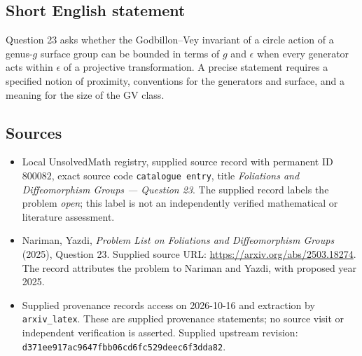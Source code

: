 \documentclass[11pt]{article}
\begin{document}
\subsection{Short English statement}
Question 23 asks whether the Godbillon--Vey invariant of a circle action of a genus-\(g\) surface group can be bounded in terms of \(g\) and \(\epsilon\) when every generator acts within \(\epsilon\) of a projective transformation. A precise statement requires a specified notion of proximity, conventions for the generators and surface, and a meaning for the size of the GV class.
\subsection{Sources}
\begin{itemize}
\item Local UnsolvedMath registry, supplied source record with permanent ID \(800082\), exact source code \texttt{catalogue entry}, title \emph{Foliations and Diffeomorphism Groups --- Question 23}. The supplied record labels the problem \emph{open}; this label is not an independently verified mathematical or literature assessment.
\item Nariman, Yazdi, \emph{Problem List on Foliations and Diffeomorphism Groups} (2025), Question 23. Supplied source URL: \url{https://arxiv.org/abs/2503.18274}. The record attributes the problem to Nariman and Yazdi, with proposed year 2025.
\item Supplied provenance records access on 2026-10-16 and extraction by \texttt{arxiv\_latex}. These are supplied provenance statements; no source visit or independent verification is asserted. Supplied upstream revision: \texttt{d371ee917ac9647fbb06cd6fc529deec6f3dda82}.
\end{itemize}
\end{document}
